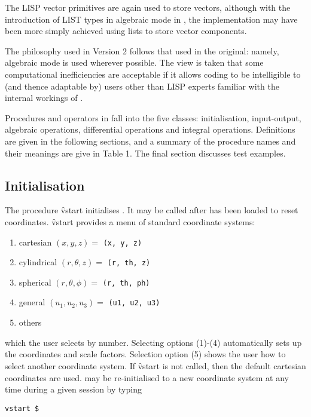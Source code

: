 The LISP vector primitives are again used to store vectors, although
with the introduction of LIST types in algebraic mode in , the implementation may have been more simply achieved
using lists to store vector components.

The philosophy used in Version 2 follows that used in the original:
namely, algebraic mode is used wherever possible.  The view is taken
that some computational inefficiencies are acceptable if it allows
coding to be intelligible to (and thence adaptable by) users other
than LISP experts familiar with the internal workings of \REDUCE.

Procedures and operators in  fall into the five classes:
initialisation, input-output, algebraic operations, differential
operations and integral operations.  Definitions are given in
the following sections, and
a summary of the procedure names and their meanings are give in Table 1.
The final section discusses test examples.

\subsection{Initialisation}\label{vstart}
\hypertarget{command:VSTART}{}
The procedure \f{vstart} initialises .  It may be
called after  has been loaded to reset coordinates.
\f{vstart} provides a
menu of standard coordinate systems:

\begin{enumerate}
\item cartesian $(x, y, z) = $ \texttt{(x, y, z)}
\item cylindrical $(r, \theta, z) = $ \texttt{(r, th, z)}
\item spherical $(r, \theta, \phi) = $ \texttt{(r, th, ph) }
\item general $( u_1, u_2, u_3 ) = $ \texttt{(u1, u2, u3) }
\item others
\end{enumerate}

which the user selects by number.  Selecting options (1)-(4)
automatically sets up the coordinates and scale factors.  Selection
option (5) shows the user how to select another coordinate system.  If
\f{vstart} is not called, then the default cartesian coordinates are used.
 may be re-initialised to a new coordinate system at any time
during a given \REDUCE session by typing
\begin{verbatim}
vstart $
\end{verbatim}

